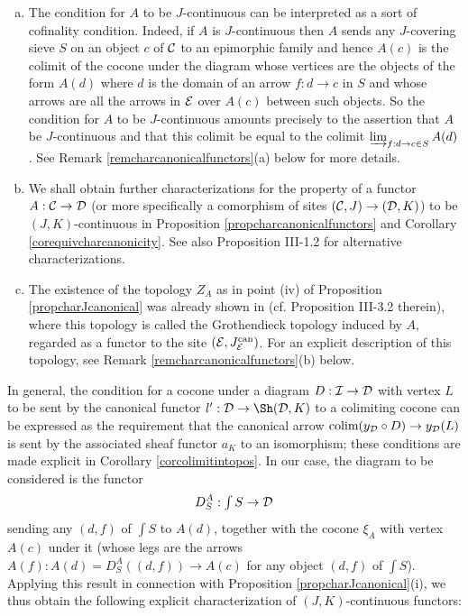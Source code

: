 \documentclass[a4paper,12pt]{article}
\begin{document}
\begin{remarks}\label{remcontinuityprelim}
	\begin{enumerate}[(a)]		
		\item The condition for $A$ to be $J$-continuous can be interpreted as a sort of cofinality condition. Indeed, if $A$ is $J$-continuous then $A$ sends any $J$-covering sieve $S$ on an object $c$ of $\cal C$ to an epimorphic family and hence $A(c)$ is the colimit of the cocone under the diagram whose vertices are the objects of the form $A(d)$ where $d$ is the domain of an arrow $f:d\to c$ in $S$ and whose arrows are all the arrows in $\cal E$ over $A(c)$ between such objects. So the condition for $A$ to be $J$-continuous amounts precisely to the assertion that $A$ be $J$-continuous and that this colimit be equal to the colimit $\varinjlim_{f:d\to c \in S} A(d)$. See Remark \ref{remcharcanonicalfunctors}(a) below for more details.
		
		\item We shall obtain further characterizations for the property of a functor $A:{\cal C}\to {\cal D}$ (or more specifically a comorphism of sites $({\cal C}, J)\to ({\cal D}, K)$) to be $(J, K)$-continuous in Proposition \ref{propcharcanonicalfunctors} and Corollary \ref{corequivcharcanonicity}. See also Proposition III-1.2 \cite{grothendieck} for alternative characterizations. 
		
		\item The existence of the topology $Z_{A}$ as in point (iv) of Proposition \ref{propcharJcanonical} was already shown in \cite{grothendieck} (cf. Proposition III-3.2 therein), where this topology is called the Grothendieck topology induced by $A$, regarded as a functor to the site $({\cal E}, J^{\textup{can}}_{\cal E})$. For an explicit description of this topology, see Remark \ref{remcharcanonicalfunctors}(b) below. 
	\end{enumerate}
\end{remarks}

In general, the condition for a cocone under a diagram $D:{\cal I}\to {\cal D}$ with vertex $L$ to be sent by the canonical functor $l':{\cal D}\to \Sh({\cal D}, K)$ to a colimiting cocone can be expressed as the requirement that the canonical arrow $\textup{colim}(y_{\cal D}\circ D)\to y_{\cal D}(L)$ is sent by the associated sheaf functor $a_{K}$ to an isomorphism; these conditions are made explicit in Corollary \ref{corcolimitintopos}. In our case, the diagram to be considered is the functor 
\[
D^{A}_{S}:{\textstyle \int S} \to {\cal D}  
\]
sending any $(d, f)$ of $\int S$ to $A(d)$, together with the cocone $\xi_{A}$ with vertex $A(c)$ under it (whose legs are the arrows $A(f):A(d)=D^{A}_{S}((d, f))\to A(c)$ for any object $(d, f)$ of $\int S$). Applying this result in connection with Proposition \ref{propcharJcanonical}(i), we thus obtain the following explicit characterization of $(J, K)$-continuous functors:
\end{document}
